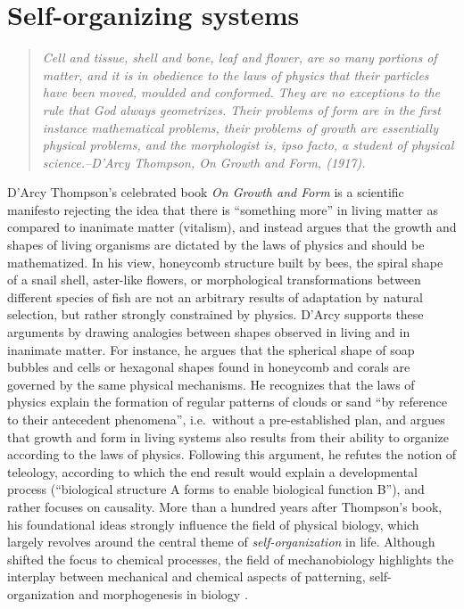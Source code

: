 

\section{Self-organizing systems}
\begin{quote}\textit{Cell and tissue, shell and bone, leaf and flower, are so many portions of matter, and it is in obedience to the laws of physics that their particles have been moved, moulded and conformed. They are no exceptions to the rule that God always geometrizes. Their problems of form are in the first instance mathematical problems, their problems of growth are essentially physical problems, and the morphologist is, ipso facto, a student of physical science.--D'Arcy Thompson, On Growth and Form, (1917).} \end{quote}

D'Arcy Thompson's celebrated book  \emph{On Growth and Form} \cite{thompson_1992} is a scientific manifesto rejecting the idea that there is ``something more'' in living matter as compared to inanimate matter (vitalism), and instead argues that the growth and shapes of living organisms are dictated by the laws of physics and should be mathematized. In his view,  honeycomb structure built by bees, the spiral shape of a snail shell, aster-like flowers, or morphological transformations between different species of fish are not an arbitrary results of adaptation by natural selection, but rather strongly constrained by physics. D'Arcy supports these arguments by drawing analogies between shapes observed in living and in inanimate matter. For instance, he argues that the spherical shape of soap bubbles and cells or hexagonal shapes found in honeycomb and corals are governed by the same physical mechanisms. He recognizes that the laws of physics explain the formation of regular patterns of clouds or sand ``by reference to their antecedent phenomena'', i.e.~without a pre-established plan, and argues that growth and form in living systems also results from their ability to organize  according to the laws of physics. Following this argument, he refutes the notion of teleology, according to which the end result would explain a developmental process (``biological structure A forms to enable biological function B''), and rather focuses on causality. More than a hundred years after Thompson's book, his foundational ideas strongly influence the field of physical biology, which largely revolves around the central theme of \emph{self-organization} in life. Although \citet{turing1952} shifted the focus to chemical processes, the field of mechanobiology highlights the interplay between mechanical and chemical aspects of patterning, self-organization and morphogenesis in biology \cite{bois2011,doi:10.1146/annurev-biophys-070816-033602,Burkart:2022tu,Gross:2019ug}.




